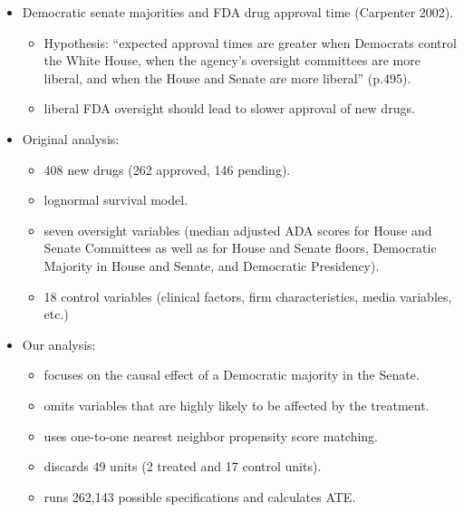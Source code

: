 \documentclass[20pt,landscape,pdftex]{foils}
\begin{document}
\begin{itemize}
\item Democratic senate majorities and FDA drug approval time
  (Carpenter 2002).\pause
  \begin{itemize}
  \item Hypothesis: ``expected approval times are greater when
    Democrats control the White House, when the agency's oversight
    committees are more liberal, and when the House and Senate are
    more liberal'' (p.495).\pause
  \item liberal FDA oversight should lead to slower approval of new
    drugs.\pause 
  \end{itemize}

\item Original analysis:\pause
  \begin{itemize}
  \item 408 new drugs (262 approved, 146 pending).\pause
  \item lognormal survival model.\pause
  \item seven oversight variables (median adjusted ADA scores for
    House and Senate Committees as well as for House and Senate
    floors, Democratic Majority in House and Senate, and Democratic
    Presidency).\pause
  \item 18 control variables (clinical factors, firm characteristics,
    media variables, etc.)\pause
  \end{itemize}

\item Our analysis:\pause
  \begin{itemize}
  \item focuses on the causal effect of a Democratic majority in the
    Senate.\pause
  \item omits variables that are highly likely to be affected by the
    treatment.\pause
  \item uses one-to-one nearest neighbor propensity score matching.\pause
  \item discards 49 units (2 treated and 17 control units).\pause
  \item runs 262,143 possible specifications and calculates ATE.\pause
  \end{itemize}
\end{itemize}


\end{document}
